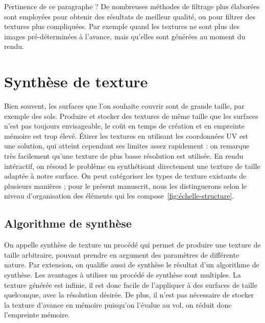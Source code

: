 {\color{red}Pertinence de ce paragraphe ?}
De nombreuses méthodes de filtrage plus élaborées sont employées pour obtenir des résultats de meilleur qualité, ou pour filtrer des textures plus compliquées. Par exemple quand les textures ne sont plus des images pré-déterminées à l'avance, mais qu'elles sont générées au moment du rendu.

\section{Synthèse de texture}

Bien souvent, les surfaces que l'on souhaite couvrir sont de grande taille, par exemple des sols. Produire et stocker des textures de même taille que les surfaces n'est pas toujours envisageable, le coût en temps de création et en empreinte mémoire est trop élevé. Étirer les textures en utilisant les coordonnées UV est une solution, qui atteint cependant ses limites assez rapidement : on remarque très facilement qu'une texture de plus basse résolution est utilisée. En rendu intéractif, on résoud le problème en synthétisant directement une texture de taille adaptée à notre surface. On peut catégoriser les types de texture existants de plusieurs manières ; pour le présent manuscrit, nous les distinguerons selon le niveau d'organisation des éléments qui les compose~\ref{fig:échelle-structure}.

\subsection*{Algorithme de synthèse}

On appelle synthèse de texture un procédé qui permet de produire une texture de taille arbitraire, pouvant prendre en argument des paramètres de différente nature. Par extension, on qualifie aussi de synthèse le résultat d'un algorithme de synthèse. Les avantages à utiliser un procédé de synthèse sont multiples. La texture générée est infinie, il est donc facile de l'appliquer à des surfaces de taille quelconque, avec la résolution désirée. De plus, il n'est pas nécessaire de stocker la texture d'avance en mémoire puisqu'on l'évalue au vol, on réduit donc l'empreinte mémoire.


